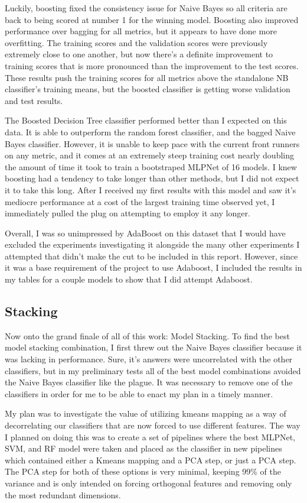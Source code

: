 \documentclass[12pt]{article}
\begin{document}
Luckily, boosting fixed the consistency issue for Naive Bayes so all criteria are back to being scored at number 1 for the winning model. 
Boosting also improved performance over bagging for all metrics, but it appears to have done more overfitting. The training scores and the 
validation scores were previously extremely close to one another, but now there's a definite improvement to training scores that is more pronounced
than the improvement to the test scores. These results push the training scores for all metrics above the standalone NB classifier's training
means, but the boosted classifier is getting worse validation and test results.

The Boosted Decision Tree classifier performed better than I expected on this data. It is able to outperform the random forest classifier, and 
the bagged Naive Bayes classifier. However, it is unable to keep pace with the current front runners on any metric, and it comes at an 
extremely steep training cost nearly doubling the amount of time it took to train a bootstraped MLPNet of 16 models. I knew boosting had a 
tendency to take longer than other methods, but I did not expect it to take this long. After I received my first results with this model and 
saw it's mediocre performance at a cost of the largest training time observed yet, I immediately pulled the plug on attempting to employ it any 
longer. 

Overall, I was so unimpressed by AdaBoost on this dataset that I would have excluded the experiments investigating it alongside the many other 
experiments I attempted that didn't make the cut to be included in this report. However, since it was a base requirement of the project to 
use Adaboost, I included the results in my tables for a couple models to show that I did attempt Adaboost.

\subsection{Stacking}
Now onto the grand finale of all of this work: Model Stacking. To find the best model stacking combination, I first threw out the Naive Bayes 
classifier because it was lacking in performance. Sure, it's answers were uncorrelated with the other classifiers, but in my preliminary tests
all of the best model combinations avoided the Naive Bayes classifier like the plague. It was necessary to remove one of the classifiers in order 
for me to be able to enact my plan in a timely manner.

My plan was to investigate the value of utilizing kmeans mapping as a way of decorrelating our classifiers that are now forced to use different 
features. The way I planned on doing this was to create a set of pipelines where the best MLPNet, SVM, and RF model were taken and placed as 
the classifier in new pipelines which contained either a Kmeans mapping and a PCA step, or just a PCA step. The PCA step for both of these options
is very minimal, keeping 99\% of the variance and is only intended on forcing orthogonal features and removing only the most redundant dimensions.
\end{document}
